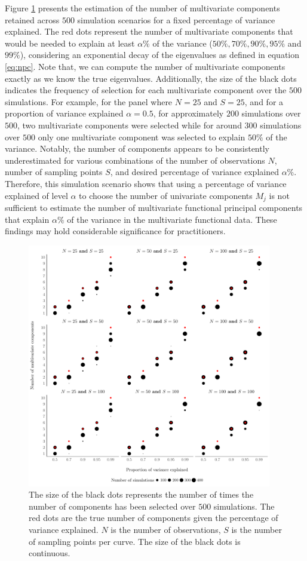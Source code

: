 Figure \ref{fig:npc_estim} presents the estimation of the number of multivariate components retained across $500$ simulation scenarios for a fixed percentage of variance explained. The red dots represent the number of multivariate components that would be needed to explain at least $\alpha\%$ of the variance ($50\%, 70\%, 90\%, 95\%$ and $99\%$), considering an exponential decay of the eigenvalues as defined in equation \eqref{eq:npc}. Note that, we can compute the number of multivariate components exactly as we know the true eigenvalues. Additionally, the size of the black dots indicates the frequency of selection for each multivariate component over the $500$ simulations. For example, for the panel where $N = 25$ and $S = 25$, and for a proportion of variance explained $\alpha = 0.5$, for approximately $200$ simulations over $500$, two multivariate components were selected while for around $300$ simulations over $500$ only one multivariate component was selected to explain $50\%$ of the variance. Notably, the number of components appears to be consistently underestimated for various combinations of the number of observations $N$, number of sampling points $S$, and desired percentage of variance explained $\alpha\%$. Therefore, this simulation scenario shows that using a percentage of variance explained of level $\alpha$ to choose the number of univariate components $M_j$ is not sufficient to estimate the number of multivariate functional principal components that explain $\alpha\%$ of the variance in the multivariate functional data. These findings may hold considerable significance for practitioners.
\begin{figure}
     \centering
    \includegraphics[width=0.95\textwidth]{figures/npc_estim.pdf}
    \caption{The size of the black dots represents the number of times the number of components has been selected over $500$ simulations. The red dots are the true number of components given the percentage of variance explained. $N$ is the number of observations, $S$ is the number of sampling points per curve. The size of the black dots is continuous.}
    \label{fig:npc_estim}
\end{figure}

